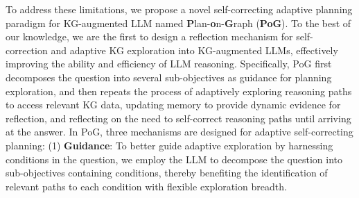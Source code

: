 \documentclass{article}
\begin{document}

To address these limitations, we propose a novel self-correcting adaptive planning paradigm for KG-augmented LLM named \textbf{P}lan-\textbf{o}n-\textbf{G}raph (\textbf{PoG}).
To the best of our knowledge, we are the first to design a reflection mechanism for self-correction and adaptive KG exploration into KG-augmented LLMs, effectively improving the ability and efficiency of LLM reasoning.
Specifically, PoG first decomposes the question into several sub-objectives as guidance for planning exploration, and then repeats the process of adaptively exploring reasoning paths to access relevant KG data, updating memory to provide dynamic evidence for reflection, and reflecting on the need to self-correct reasoning paths until arriving at the answer. In PoG,
three mechanisms are designed for adaptive self-correcting planning: (1) \textbf{Guidance}: To better guide adaptive exploration by harnessing conditions in the question, we employ the LLM to decompose the question into sub-objectives containing conditions, thereby benefiting the identification of relevant paths to each condition with flexible exploration breadth.
\end{document}
